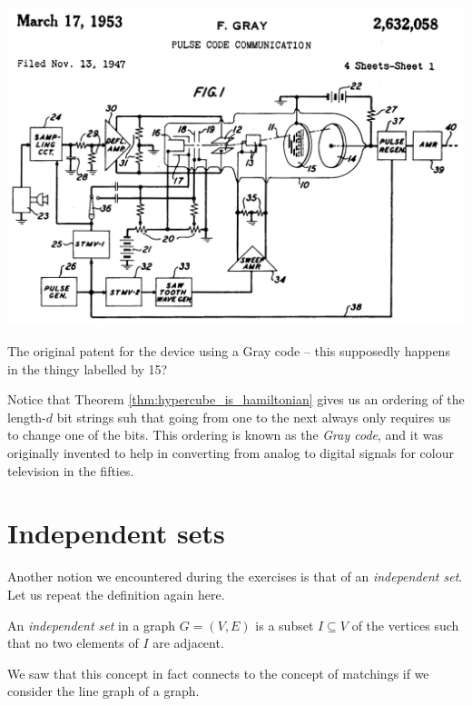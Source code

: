 \documentclass[nobib]{tufte-handout}
\begin{document}
\begin{marginfigure}
    \centering
    \includegraphics[width=1.0\textwidth]{graphics/L8_vx_covers_hamiltonicity_etc/gray_code_patent.png}
    \caption{The original patent for the device using a Gray code -- this supposedly happens in the thingy labelled by 15?}
    \label{fig:gray_code_patent}
\end{marginfigure}

\begin{remark}
    Notice that Theorem \ref{thm:hypercube_is_hamiltonian} gives us an ordering of the length-$d$ bit strings suh that going from one to the next always only requires us to change one of the bits. This ordering is known as the \emph{Gray code}, and it was originally invented to help in converting from analog to digital signals for colour television in the fifties.
\end{remark}

\section{Independent sets}

Another notion we encountered during the exercises is that of an \emph{independent set}. Let us repeat the definition again here.

\begin{definition}
    An \emph{independent set} in a graph $G = (V,E)$ is a subset $I \subseteq V$ of the vertices such that no two elements of $I$ are adjacent.
\end{definition}

We saw that this concept in fact connects to the concept of matchings if we consider the line graph of a graph.
\end{document}
